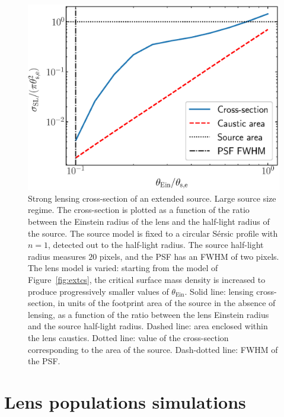 \documentclass{aa}
\def\tein{\theta_{\mathrm{Ein}}}
\def\Fref#1{Figure~\ref{#1}\xspace}
\begin{document}
\begin{figure}
\includegraphics[width=\columnwidth]{largesource_cs.eps}
\caption{
Strong lensing cross-section of an extended source. Large source size regime.
The cross-section is plotted as a function of the ratio between the Einstein radius of the lens and the half-light radius of the source.
The source model is fixed to a circular S\'{e}rsic profile with $n=1$, detected out to the half-light radius.
The source half-light radius measures $20$ pixels, and the PSF has an FWHM of two pixels.
The lens model is varied: starting from the model of \Fref{fig:extcs}, the critical surface mass density is increased to produce progressively smaller values of $\tein$.
Solid line: lensing cross-section, in units of the footprint area of the source in the absence of lensing, as a function of the ratio between the lens Einstein radius and the source half-light radius.
Dashed line: area enclosed within the lens caustics.
Dotted line: value of the cross-section corresponding to the area of the source.
Dash-dotted line: FWHM of the PSF.
\label{fig:largesourcecs}
}
\end{figure}


\section{Lens populations simulations}\label{sect:lenspop}
\end{document}

